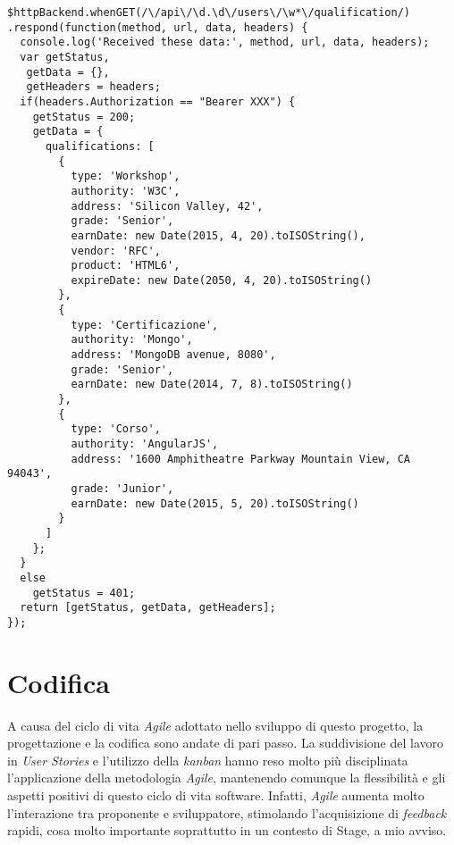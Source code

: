 \begin{verbatim}
$httpBackend.whenGET(/\/api\/\d.\d\/users\/\w*\/qualification/)
.respond(function(method, url, data, headers) {
  console.log('Received these data:', method, url, data, headers);
  var getStatus,
   getData = {},
   getHeaders = headers;
  if(headers.Authorization == "Bearer XXX") {
    getStatus = 200;
    getData = {
      qualifications: [
        {
          type: 'Workshop',
          authority: 'W3C',
          address: 'Silicon Valley, 42',
          grade: 'Senior',
          earnDate: new Date(2015, 4, 20).toISOString(),
          vendor: 'RFC',
          product: 'HTML6',
          expireDate: new Date(2050, 4, 20).toISOString()
        },
        {
          type: 'Certificazione',
          authority: 'Mongo',
          address: 'MongoDB avenue, 8080',
          grade: 'Senior',
          earnDate: new Date(2014, 7, 8).toISOString()
        },
        {
          type: 'Corso',
          authority: 'AngularJS',
          address: '1600 Amphitheatre Parkway Mountain View, CA 94043',
          grade: 'Junior',
          earnDate: new Date(2015, 5, 20).toISOString()
        }
      ]
    };
  }
  else
    getStatus = 401;
  return [getStatus, getData, getHeaders];
});
\end{verbatim} 

\section{Codifica}
A causa del ciclo di vita \emph{Agile} adottato nello sviluppo di questo progetto, la progettazione e la codifica sono andate di pari passo. La suddivisione del lavoro in \emph{User Stories} e l'utilizzo della \emph{kanban} hanno reso molto più disciplinata l'applicazione della metodologia \emph{Agile}, mantenendo comunque la flessibilità e gli aspetti positivi di questo ciclo di vita software. Infatti, \emph{Agile} aumenta molto l'interazione tra proponente e sviluppatore, stimolando l'acquisizione di \emph{feedback} rapidi, cosa molto importante soprattutto in un contesto di Stage, a mio avviso.


